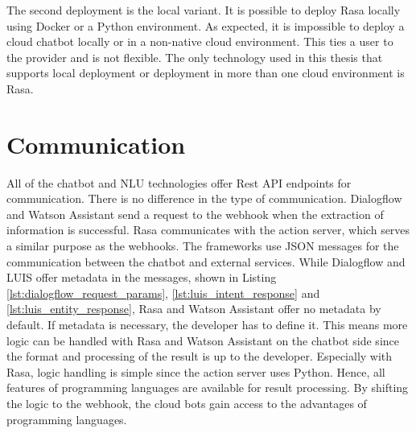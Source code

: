The second deployment is the local variant.
It is possible to deploy Rasa locally using Docker or a Python environment.
As expected, it is impossible to deploy a cloud chatbot locally or in a non-native cloud environment.
This ties a user to the provider and is not flexible.
The only technology used in this thesis that supports local deployment or deployment in more than one cloud environment is Rasa. 

\section*{Communication}
All of the chatbot and NLU technologies offer Rest API endpoints for communication.
There is no difference in the type of communication.
Dialogflow and Watson Assistant send a request to the webhook when the extraction of information is successful.
Rasa communicates with the action server, which serves a similar purpose as the webhooks.
The frameworks use JSON messages for the communication between the chatbot and external services.
While Dialogflow and LUIS offer metadata in the messages, shown in Listing \ref{lst:dialogflow_request_params}, \ref{lst:luis_intent_response}
and \ref{lst:luis_entity_response}, Rasa and Watson Assistant offer no metadata by default.
If metadata is necessary, the developer has to define it.
This means more logic can be handled with Rasa and Watson Assistant on the chatbot side since the format and processing of the result is up to the developer.
Especially with Rasa, logic handling is simple since the action server uses Python.
Hence, all features of programming languages are available for result processing.
By shifting the logic to the webhook, the cloud bots gain access to the advantages of programming languages. 

